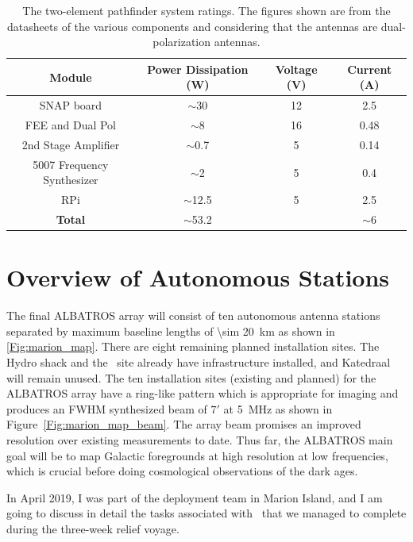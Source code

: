 \begin{table}
	\centering
	\begin{tabular}{|c | c | c | c |} 
		\hline
		Module & Power Dissipation (W) &  Voltage (V) & Current (A)\\  
		\hline
		SNAP board & $\sim$30 & 12 & 2.5\\
		\hline
		FEE and Dual Pol & $\sim$8 & 16 & 0.48 \\
		\hline
		2nd Stage Amplifier & $\sim$0.7 & 5 & 0.14\\
		\hline
		5007 Frequency Synthesizer & $\sim$2 & 5 & 0.4\\
		\hline
		RPi & $\sim$12.5 & 5 & 2.5 \\
		\hline
		\textbf{Total} & $\sim$53.2 &  & $\sim$6 \\
		\hline
	\end{tabular}
	\caption{The two-element pathfinder system ratings. The figures shown are from the datasheets of the various components and considering that the antennas are dual-polarization antennas.}
	\label{table:budget}
\end{table}

\section{Overview of Autonomous Stations}

The final ALBATROS array will consist of ten autonomous antenna stations separated by maximum baseline lengths of \SI{\sim 20}{\kilo \meter} as shown in \autoref{Fig:marion_map}. There are eight remaining planned installation sites. The Hydro shack and the \prizm\ site already have infrastructure installed, and Katedraal will remain unused. The ten installation sites (existing and planned) for the ALBATROS array have a ring-like pattern which is appropriate for imaging and produces an FWHM synthesized beam of $7'$ at \SI{5}{\mega\hertz} as shown in Figure~\ref{Fig:marion_map_beam}. The array beam promises an improved  resolution over existing measurements to date. Thus far, the ALBATROS main goal will be to map Galactic foregrounds at high resolution at low frequencies, which is crucial before doing cosmological observations of the dark ages. 

In April 2019, I was part of the deployment team in Marion Island, and I am going to discuss in detail the tasks associated with \albatros\ that we managed to complete during the three-week relief voyage.  

